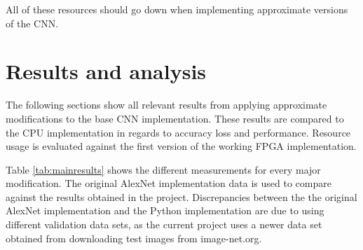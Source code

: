 \begin{enumerate}
All of these resources should go down when implementing approximate versions of the CNN.

\section{Results and analysis}

The following sections show all relevant results from applying approximate modifications
to the base CNN implementation. These results are compared to the CPU implementation
in regards to accuracy loss and performance. Resource usage is evaluated against
the first version of the working FPGA implementation.

Table \ref{tab:mainresults} shows the different measurements for every major modification. 
The original AlexNet implementation data is used to compare against the results obtained 
in the project. Discrepancies between the the original AlexNet implementation and the
Python implementation are due to using different validation data sets, as the current
project uses a newer data set obtained from downloading test images from image-net.org.

\begin{table}[H]
    \begin{center}
        \caption{Execution time, error rate and resource usage for different types of kernel and approximate modifications.}
            \label{tab:mainresults}
    \end{center}
\end{table}


\end{enumerate}
